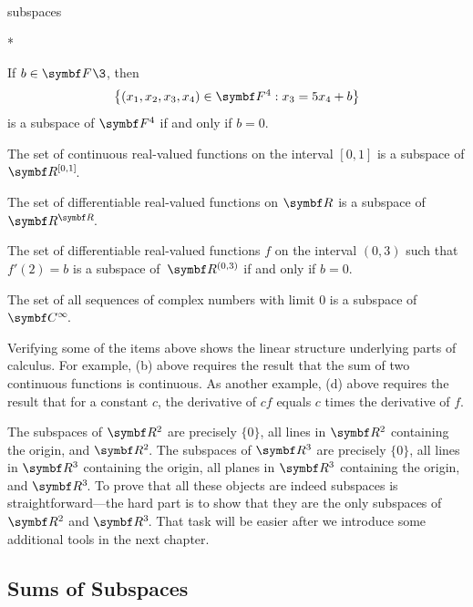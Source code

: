 \begin{example}[subspaces]{subspaces}
\begin{subtheorem}*
\item
If $b \in \F{}\3$, then
\[
\br[\big]{(x_1, x_2, x_3, x_4) \in \F{4} : x_3 = 5 x_4 + b }
\]
is a subspace of $\F{4}$ if and only if $b = 0$.
\item
The set of continuous real-valued functions on the interval $[0, 1]$ is a subspace of $\RR{[0, 1]}$.
\item
The set of differentiable real-valued functions on $\R{}$ is a subspace of~$\RR{\R{}}$.
\item
The set of differentiable real-valued functions $f$ on the interval $(0, 3)$ such that $f'\!(2) = b$ is a subspace of~$\R{(0,3)}$ if and only if
$b = 0$.
\item
The set of all sequences of complex numbers with limit $0$ is a subspace of~$\CC{\infty}$.
\end{subtheorem}
\exampleitemend
\end{example}


Verifying some of the items above shows the linear structure underlying parts of calculus. For example, (b) above requires the result that the sum of two continuous functions is continuous. As another example, (d) above requires the result that for a constant $c$, the derivative of $cf$ equals $c$ times the derivative of $f$.

The subspaces of $\R{2}$ are precisely $\{0\}$, all
lines in $\R{2}$ containing the origin, and $\RR{2}$.  The subspaces of $\R{3}$ are precisely $\{0\}$, all
lines in $\R{3}$ containing the origin, all planes in $\R{3}$ containing the origin, and $\RR{3}$.
To prove that all these objects are indeed subspaces is straightforward---the hard part is
to show that they are the only subspaces of $\R{2}$ and $\RR{3}$. That task will be
easier after we introduce some additional tools in the next chapter.

\subsection{Sums of Subspaces}


